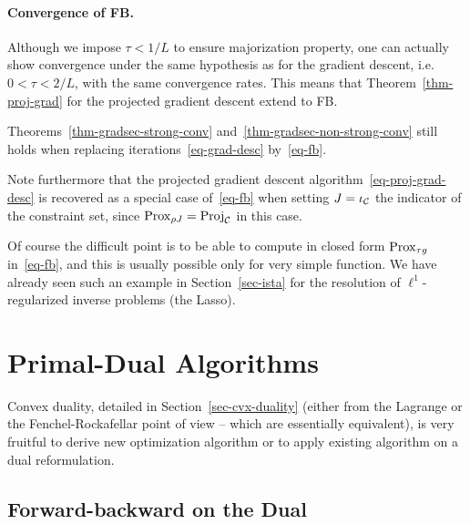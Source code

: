 \paragraph{Convergence of FB. }

Although we impose $\tau<1/L$ to ensure majorization property, one can actually show convergence under the same hypothesis as for the gradient descent, i.e. $0 < \tau < 2/L$, with the same convergence rates.  This means that Theorem~\ref{thm-proj-grad} for the projected gradient descent extend to FB. 

\begin{thm}\label{thm-fb-conv}
	Theorems~\ref{thm-gradsec-strong-conv} and~\ref{thm-gradsec-non-strong-conv} still holds when replacing iterations~\eqref{eq-grad-desc} by~\eqref{eq-fb}.
\end{thm}

Note furthermore that the projected gradient descent algorithm~\eqref{eq-proj-grad-desc} is recovered as a special case of~\eqref{eq-fb} when setting $J=\iota_{\mathcal{C}}$ the indicator of the constraint set, since $\operatorname{Prox}_{\rho J} = \operatorname{Proj}_{\mathcal{C}}$ in this case.

Of course the difficult point is to be able to compute in closed form $\operatorname{Prox}_{\tau g}$ in~\eqref{eq-fb}, and this is usually possible only for very simple function. We have already seen such an example in Section~\ref{sec-ista} for the resolution of $\ell^1$-regularized inverse problems (the Lasso).



\section{Primal-Dual Algorithms}

Convex duality, detailed in Section~\ref{sec-cvx-duality} (either from the Lagrange or the Fenchel-Rockafellar point of view -- which are essentially equivalent), is very fruitful to derive new optimization algorithm or to apply existing algorithm on a dual reformulation.

\subsection{Forward-backward on the Dual}
\label{sec-fb-dual}

